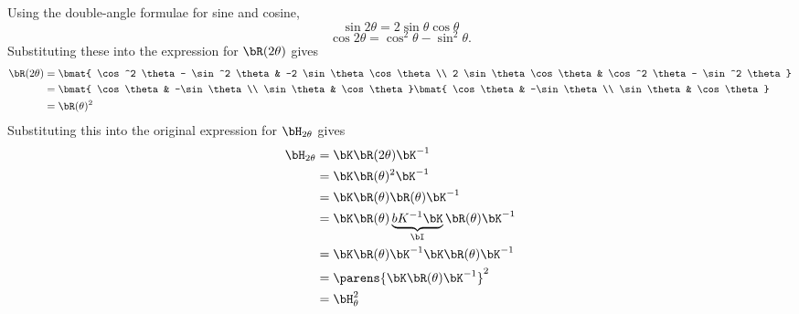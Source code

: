 \begin{problem}
\begin{enumroman}
\begin{answer}
        Using the double-angle formulae for sine and cosine,
        \[ \sin 2\theta = 2 \sin \theta \cos \theta \]
        \[ \cos 2\theta = \cos^2 \theta - \sin^2 \theta. \]
        Substituting these into the expression for $\bR(2\theta)$ gives
        \begin{align*}
          \bR(2\theta) &= \bmat{
            \cos^2 \theta - \sin^2 \theta & -2 \sin \theta \cos \theta \\
            2 \sin \theta \cos \theta & \cos^2 \theta - \sin^2 \theta
          } \\
          &= \bmat{
            \cos \theta & -\sin \theta \\
            \sin \theta & \cos \theta
          } \bmat{
            \cos \theta & -\sin \theta \\
            \sin \theta & \cos \theta
          } \\
          &= \bR(\theta)^2
        \end{align*}
        Substituting this into the original expression for $\bH_{2\theta}$ gives
        \begin{align*}
          \bH_{2\theta} &= \bK \bR(2\theta) \bK^{-1} \\
          &= \bK \bR(\theta)^2 \bK^{-1} \\
          &= \bK \bR(\theta) \bR(\theta) \bK^{-1} \\
          &= \bK \bR(\theta) \underbrace{bK^{-1} \bK}_{\bI} \bR(\theta) \bK^{-1} \\
          &= \bK \bR(\theta) \bK^{-1} \bK \bR(\theta) \bK^{-1} \\
          &= \parens{\bK \bR(\theta) \bK^{-1}}^2 \\
          &= \bH_\theta^2
        \end{align*}
      \end{answer}
  \end{enumroman}
\end{problem}
